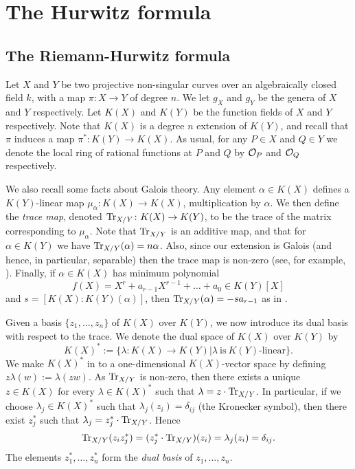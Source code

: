 \chapter{The Hurwitz formula} \label{Chapter:hurwitzformula}
\section{The Riemann-Hurwitz formula}\label{Hurwitzsection}

Let $X$ and $Y$ be two projective non-singular curves over an algebraically closed field $k$, with a map $\pi \colon X \rightarrow Y$ of degree $n$.
We let $g_X$ and $g_Y$ be the genera of $X$ and $Y$ respectively.
Let $K(X)$ and $K(Y)$ be the function fields of $X$ and $Y$ respectively.
Note that $K(X)$ is a degree $n$ extension of $K(Y)$, and recall that $\pi$ induces a map $\pi^*\colon K(Y) \rightarrow K(X)$.
As usual, for any $P \in X$ and $Q \in Y$ we denote the local ring of rational functions at $P$ and $Q$ by ${\cal O}_P$ and ${\cal O}_Q$ respectively.

We also recall some facts about Galois theory.
Any element $\alpha \in K(X)$ defines a $K(Y)$-linear map $\mu_{\alpha} \colon  K(X) \rightarrow K(X)$, multiplication by $\alpha$.
We then define the {\em trace map}, denoted $\operatorname{Tr}_{X/Y}\colon  K(X) \rightarrow K(Y)$, to be the trace of the matrix corresponding to $\mu_{\alpha}$.
Note that $\operatorname{Tr}_{X/Y}$ is an additive map, and that for $\alpha \in K(Y)$ we have $\operatorname{Tr}_{X/Y}(\alpha) = n \alpha$.
Also, since our extension is Galois (and hence, in particular, separable) then the trace map is non-zero (see, for example, \cite[Appendix A]{stichtenoth}).
Finally, if $\alpha \in K(X)$ has minimum polynomial 
\[
 f(X) = X^r + a_{r-1}X^{r-1} + \ldots +a_0 \in K(Y)[X]
\]
 and $s= [K(X):K(Y)(\alpha)]$, then $\operatorname{Tr}_{X/Y}(\alpha) = -sa_{r-1}$ as in \cite[Appendix A]{stichtenoth}.

Given a basis $\{z_1,\ldots,z_n\}$ of $K(X)$ over $K(Y)$, we now introduce its dual basis with respect to the trace.
We denote the dual space of $K(X)$ over $K(Y)$ by \[K(X)^*:=\{\lambda \colon K(X) \rightarrow K(Y)| \lambda\ \text{is}\ K(Y)\text{-linear}\}.\]
We make $K(X)^*$ in to a one-dimensional $K(X)$-vector space by defining $z \lambda(w):=\lambda(z w)$.
As $\operatorname{Tr}_{X/Y}$ is non-zero, then there exists a unique $z\in K(X)$ for every $\lambda \in K(X)^*$ such that $\lambda = z\cdot \operatorname{Tr}_{X/Y}$.
In particular, if we choose $\lambda_j\in K(X)^*$ such that $\lambda_j(z_i) = \delta_{ij}$ (the Kronecker symbol), then there exist $z_j^*$ such that $\lambda_j = z_j^*\cdot \operatorname{Tr}_{X/Y}$.
Hence
\[
 \operatorname{Tr}_{X/Y}(z_iz_j^*) = (z_j^*\cdot \operatorname{Tr}_{X/Y})(z_i) = \lambda_j(z_i) = \delta_{ij}.
\]
The elements $z_1^*, \ldots , z_n^*$ form the {\em dual basis} of $z_1, \ldots , z_n$.

